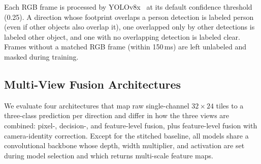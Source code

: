 Each RGB frame is processed by YOLOv8x~\cite{yolov8_ultralytics} at its default confidence threshold (0.25). A direction whose footprint overlaps a person detection is labeled person (even if other objects also overlap it), one overlapped only by other detections is labeled other object, and one with no overlapping detection is labeled clear. Frames without a matched RGB frame (within 150\,ms) are left unlabeled and masked during training.

\subsection{Multi-View Fusion Architectures}


We evaluate four architectures that map raw single-channel $32\times24$ tiles
to a three-class prediction per direction and differ in how the three
views are combined: pixel-, decision-, and feature-level fusion, plus
feature-level fusion with camera-identity correction. Except for the stitched
baseline, all models share a convolutional backbone whose depth, width
multiplier, and activation are set during model selection and which returns
multi-scale feature maps.


